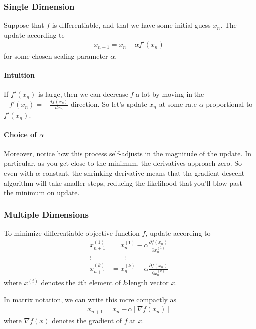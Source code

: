 \documentclass[a4paper,12pt]{scrartcl}
\theoremstyle{definition}
\theoremstyle{remark}
\begin{document}
\subsubsection{Single Dimension}

Suppose that $f$ is differentiable, and that we have some initial guess
$x_n$. The update according to
\begin{align*}
  x_{n+1} = x_n - \alpha f'(x_n)
\end{align*}
for some chosen scaling parameter $\alpha$.

\paragraph{Intuition}
If $f'(x_n)$ is large, then we can decrease $f$ a lot by moving in the
$-f'(x_n) = -\frac{df(x_n)}{dx_n}$ direction.  So let's update $x_n$ at
some rate $\alpha$ proportional to $f'(x_n)$.

\paragraph{Choice of $\alpha$}
Moreover, notice how this process self-adjusts in the
magnitude of the update.  In particular, as you get close to
the minimum, the derivatives approach zero.  So even with 
$\alpha$ constant, the shrinking derivative means that the gradient
descent algorithm will take smaller steps, reducing the likelihood that
you'll blow past the minimum on update.


\subsubsection{Multiple Dimensions}

To minimize differentiable objective function $f$, update according to
\begin{align*}
   x_{n+1}^{(1)} &= x_n^{(1)}
    - \alpha \frac{\partial f(x_n)}{\partial x_n^{(1)}}\\
   \vdots \quad & \qquad \vdots \\
   x_{n+1}^{(k)} &= x_n^{(k)}
    - \alpha \frac{\partial f(x_n)}{\partial x_n^{(k)}}
\end{align*}
where $x^{(i)}$ denotes the $i$th element of $k$-length vector $x$.

In matrix notation, we can write this more compactly as
\begin{align*}
  \label{eq:multigradesc}
  x_{n+1} = x_n - \alpha [\nabla f(x_n)]
\end{align*}
where $\nabla f(x)$ denotes the gradient of $f$ at $x$.
\end{document}
